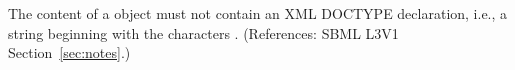 The content of a \Notes object must not contain an XML
DOCTYPE declaration, i.e., a string beginning with the characters
.  (References: SBML L3V1 Section~\ref{sec:notes}.)

